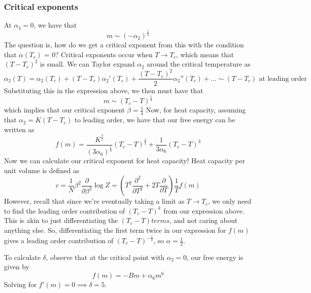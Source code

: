 \subsubsection*{Critical exponents} 
At $\alpha_4 = 0$, we have that 
\[ 
m \sim ( - \alpha_2)^{ \frac{ 1}{ 4} }  
\] 
The question is, how do we get a critical exponent from this with the condition that $\alpha(T_c)$  = 0? Critical exponents occur when $T \rightarrow T_c$, which means that $( T  - T_c)^2$ is small. We can Taylor expand $\alpha_2$ around the critical temperature as
\[ 
\alpha_ 2( T ) = \alpha_2(T_c) + ( T - T_c ) \alpha_2'(T_c) + \frac{ ( T - T_c)^2}{ 2} \alpha_2''(T_c) + \dots \sim ( T  - T_c) \text{ at leading order }
\] 
Substituting this in the expression above, we then must have that 
\[ 
m \sim ( T_c - T )^{ \frac{1}{4} } 
\] which implies that our critical exponent $\beta = \frac{1}{ 4} $ Now, for heat capacity, assuming that $\alpha_2 = K(T  - T_c ) $ to leading order, we have that our free energy can be written as 
\[ 
f(m) = \frac{  K^{ \frac{3}{2} } }{ ( 3 \alpha_6 )^ \frac{ 1}{ 2}}(  T_c - T )^{ \frac{3}{2}} + \frac{1 }{ 3 \alpha_6 } (T_c  - T )^3 
\] Now we can calculate our critical exponent for heat capacity! Heat capacity per unit volume is defined as 
\[ 
c = \frac{1}{N } \beta^2 \frac{ \partial }{ \partial \beta^2 } \log Z  = \left(  T^2 \frac{ \partial^2 }{ \partial T^2 } + 2T \frac{ \partial }{ \partial T } \right) \frac{ 1}{ T} f(m)
\] However, recall that since we're eventually taking a limit as $T \rightarrow T_c$, we only need to find the leading order contribution of $(T_c - T)^k$ from our expression above. This is akin to just differentiating the $( T_c - T ) terms $, and not caring about anything else. So, differentiating the first term twice in our expression for $f(m)$ gives a leading order contribution of $(T_c  - T)^{ - \frac{ 1}{2} } $, so $\alpha  = \frac{ 1}{2} $. 

To calculate $\delta$, observe that at the critical point with $\alpha_2 = 0$, our free energy is given by 
\[ 
f(m ) =  -B m + \alpha_6 m^6 
\] Solving for $f'(m) = 0 \implies \delta = 5$.  


